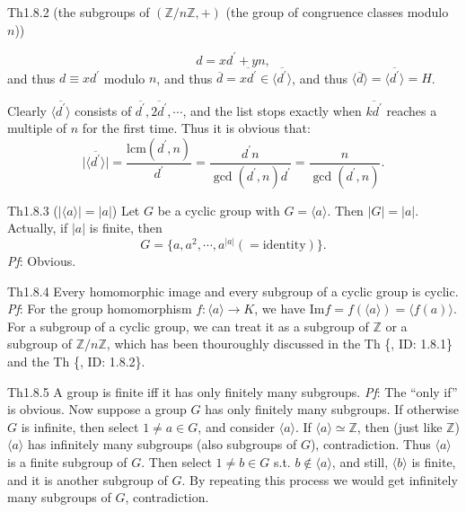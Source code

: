 \documentclass{article}
\newcommand{\lcm}{\text{lcm}}
\begin{document}
\begin{Th}{Th1.8.2 (the subgroups of $(\mathbb{Z}/n\mathbb{Z}, +)$ (the group of congruence classes modulo $n$))}
\begin{compactenum}
        $$ d = xd^\prime + yn, $$
        and thus $d\equiv xd^\prime$ modulo $n$, and thus $\overline{d} = \overline{xd^\prime}\in\langle \overline{d^\prime}\rangle$, and thus $\langle \overline{d}\rangle = \langle \overline{d^\prime}\rangle = H$.
        \item Clearly $\langle \overline{d^\prime}\rangle$ consists of $\overline{d^\prime}, \overline{2d^\prime}, \cdots$, and the list stops exactly when $\overline{kd^\prime}$ reaches a multiple of $n$ for the first time. Thus it is obvious that:
        $$ \big|\langle \overline{d^\prime}\rangle\big| = \frac{\lcm(d^\prime, n)}{d^\prime} = \frac{d^\prime n}{\gcd(d^\prime, n)d^\prime} = \frac{n}{\gcd(d^\prime, n)}. $$
    \end{compactenum}
\end{Th}

\begin{Th}{Th1.8.3 ($\big|\langle a\rangle\big| = |a|$)}
    Let $G$ be a cyclic group with $G = \langle a\rangle$. Then $|G| = |a|$. Actually, if $|a|$ is finite, then
    $$ G = \{a, a^2, \cdots, a^{|a|}(=\text{identity})\}. $$
    \tcblower
    \textit{Pf}: Obvious.
\end{Th}

\begin{Th}{Th1.8.4}
    Every homomorphic image and every subgroup of a cyclic group is cyclic.
    \tcblower
    \textit{Pf}: For the group homomorphism $f:\langle a\rangle\to K$, we have $\text{Im} f = f(\langle a \rangle) = \langle f(a)\rangle$. For a subgroup of a cyclic group, we can treat it as a subgroup of $\mathbb{Z}$ or a subgroup of $\mathbb{Z}/n\mathbb{Z}$, which has been thouroughly discussed in the Th \{, ID: 1.8.1\} and the Th \{, ID: 1.8.2\}.
\end{Th}

\begin{Th}{Th1.8.5}
    A group is finite iff it has only finitely many subgroups.
    \tcblower
    \textit{Pf}: The ``only if'' is obvious. Now suppose a group $G$ has only finitely many subgroups. If otherwise $G$ is infinite, then select $1\neq a\in G$, and consider $\langle a\rangle$. If $\langle a\rangle \simeq \mathbb{Z}$, then (just like $\mathbb{Z}$) $\langle a\rangle$ has infinitely many subgroups (also subgroups of $G$), contradiction. Thus $\langle a\rangle$ is a finite subgroup of $G$. Then select $1\neq b \in G$ s.t. $b\notin\langle a\rangle$, and still, $\langle b\rangle$ is finite, and it is another subgroup of $G$. By repeating this process we would get infinitely many subgroups of $G$, contradiction.
\end{Th}
\end{document}
